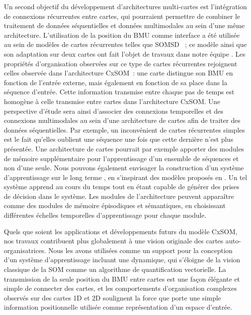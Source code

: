 Un second objectif du développement d'architectures multi-cartes est l'intégration de connexions récurrentes entre cartes, qui pourraient permettre de combiner le traitement de données séquentielles et données multimodales au sein d'une même architecture.
L'utilisation de la position du BMU comme interface a été utilisée au sein de modèles de cartes récurrentes telles que SOMSD \parencite{hagenbuchner_self-organizing_2003}~; ce modèle ainsi que son adaptation sur deux cartes ont fait l'objet de travaux dans notre équipe \parencite{baheux_towards_2014, fix20}. 
Les propriétés d'organisation observées sur ce type de cartes récurrentes rejoignent celles observée dans l'architecture CxSOM~: une carte distingue son BMU en fonction de l'entrée externe, mais également en fonction de sa place dans la séquence d'entrée. Cette information transmise entre chaque pas de temps est homogène à celle transmise entre cartes dans l'architecture CxSOM.
Une perspective d'étude sera ainsi d'associer des connexions temporelles et des connexions multimodales au sein d'une architecture de cartes afin de traiter des données séquentielles.
Par exemple, un inconvénient de cartes récurrentes simples est le fait qu'elles oublient une séquence une fois que cette dernière n'est plus présentée. Une architecture de cartes pourrait par exemple apporter des modules de mémoire supplémentaire pour l'apprentissage d'un ensemble de séquences et non d'une seule.
Nous pouvons également envisager la construction d'un système d'apprentissage \og sur le long terme \fg{}, en s'inspirant des modèles proposés en \cite{parisiLL,parisi17}. Un tel système apprend au cours du temps tout en étant capable de générer des prises de décision dans le système. Les modules de l'architecture peuvent apparaître comme des modules de mémoire épisodiques et sémantiques, en choisissant différentes échelles temporelles d'apprentissage pour chaque module.


Quels que soient les applications et développements futurs du modèle CxSOM, nos travaux contribuent plus globalement à une vision originale des cartes auto-organisatrices. Nous les avons utilisées comme un support pour la conception d'un système d'apprentissage incluant une dynamique, qui s'éloigne de la vision classique de la SOM comme un algorithme de quantification vectorielle.
La transmission de la seule position du BMU entre cartes est une façon élégante et simple de connecter des cartes, et les comportements d'organisation complexes observés sur des cartes 1D et 2D soulignent la force que porte une simple information positionnelle utilisée comme représentation d'un espace d'entrée.



